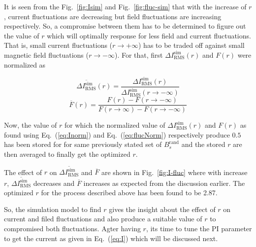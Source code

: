 \FloatBarrier
It is seen from the Fig.~\ref{fig:Isim} and Fig.~\ref{fig:fluc-sim} that with the increase of $r$, current fluctuations are decreasing but field fluctuations are increasing respectively. So, a compromise between them has to be determined to figure out the value of $r$ which will optimally response for less field and current fluctuations.  That is, small current fluctuations ($r \rightarrow + \infty$) has to be traded off against small magnetic field fluctuations ($r \rightarrow - \infty$). For that, first $\Delta I_{\text{RMS}}^{\text{sim}}(r)$ and $F(r)$ were normalized as

\begin{equation}\label{eq:Inorm}
    \overline{\Delta I_{\text{RMS}}^{\text{sim}}}(r)=\frac{\Delta I_{\text{RMS}}^{\text{sim}}(r)}{\Delta I_{\text{RMS}}^{\text{sim}}(r\rightarrow - \infty)}
\end{equation}
\begin{equation}\label{eq:flucNorm}
    \overline{F}(r)=\frac{F(r)- F(r\rightarrow - \infty)}{F(r\rightarrow \infty)- F(r\rightarrow - \infty)}
\end{equation}

Now, the value of $r$ for which the normalized value of $\Delta I_{\text{RMS}}^{\text{sim}}(r)$ and $F(r)$  as found using Eq.~(\ref{eq:Inorm}) and Eq.~(\ref{eq:flucNorm}) respectively produce $0.5$ has been stored for for same previously stated set of $B_s^{\text{rand}}$ and the stored $r$ are then averaged to finally get the optimized $r$. 

The effect of $r$ on $\overline{\Delta I_{\text{RMS}}^{\text{sim}}}$ and $\overline{F}$ are shown in Fig.~\ref{fig:I-fluc} where with increase $r$, $\overline{\Delta I_{\text{RMS}}^{\text{sim}}}$ decreases and $\overline{F}$ increases as expected from the discussion earlier. The optimized $r$ for the process described above has been found to be 2.87.


\FloatBarrier

So, the simulation model to find $r$ gives the insight about the effect of $r$ on current and filed fluctuations and also produce a suitable value of $r$ to compromised both fluctuations. Agter having $r$, its time to tune the PI parameter to get the current as given in Eq.~(\ref{eq:I}) which will be discussed next.

